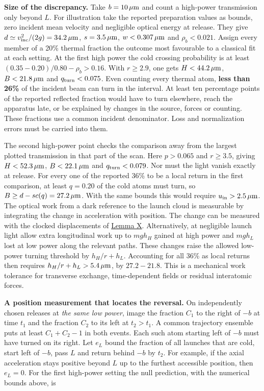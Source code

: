 \documentclass[11pt,a4paper]{article}
\begin{document}
\textbf{Size of the discrepancy.} Take \(b=10\,\mu{\rm m}\) and count a
high-power transmission only beyond \(L\). For illustration take the
reported preparation values as bounds, zero incident mean velocity and
negligible optical energy at release. They give
\(d\simeq v_{\rm inc}^2/(2g)=34.2\,\mu{\rm m}\), \(s=3.5\,\mu{\rm m}\),
\(w<0.307\,\mu{\rm m}\) and \(\rho_b<0.021\). Assign every member of a
20\% thermal fraction the outcome most favourable to a classical fit at
each setting. At the first high power the cold crossing probability is
at least \((0.35-0.20)/0.80-\rho_b>0.16\). With \(r\ge2.9\), one gets
\(H<44.2\,\mu{\rm m}\), \(B<21.8\,\mu{\rm m}\) and
\(q_{\rm turn}<0.075\). Even counting every thermal atom, \textbf{less
than 26\%} of the incident beam can turn in the interval. At least ten
percentage points of the reported reflected fraction would have to turn
elsewhere, reach the apparatus late, or be explained by changes in the
source, forces or counting. These fractions use a common incident
denominator. Loss and normalization errors must be carried into them.

The second high-power point checks the comparison away from the largest
plotted transmission in that part of the scan. Here \(p>0.065\) and
\(r\ge3.5\), giving \(H<52.3\,\mu{\rm m}\), \(B<22.1\,\mu{\rm m}\) and
\(q_{\rm turn}<0.079\). Nor must the light vanish exactly at release.
For every one of the reported 36\% to be a local return in the first
comparison, at least \(q=0.20\) of the cold atoms must turn, so
\(B\ge d-s c(q)=27.2\,\mu{\rm m}\). With the same bounds this would
require \(u_{\rm in}>2.5\,\mu{\rm m}\). The optical work from a dark
reference to the launch cloud is measurable by integrating the change in
acceleration with position. The change can be measured with the clocked
displacements of
\href{newton-insertion-action.md\#lemma-x-and-the-measurement-of-initial-force}{Lemma
X}. Alternatively, at negligible launch light allow extra longitudinal
work up to \(mg h_H\) gained at high power and \(mg h_L\) lost at low
power along the relevant paths. These changes raise the allowed
low-power turning threshold by \(h_H/r+h_L\). Accounting for all 36\% as
local returns then requires \(h_H/r+h_L>5.4\,\mu{\rm m}\), by
\(27.2-21.8\). This is a mechanical work tolerance for transverse
exchange, time-dependent fields or residual interatomic forces.

\textbf{A position measurement that locates the reversal.} On
independently chosen releases at \emph{the same low power}, image the
fraction \(C_1\) to the right of \(-b\) at time \(t_1\) and the fraction
\(C_2\) to its left at \(t_2>t_1\). A common trajectory ensemble puts at
least \(C_1+C_2-1\) in both events. Each such atom starting left of
\(-b\) must have turned on its right. Let \(e_L\) bound the fraction of
all launches that are cold, start left of \(-b\), pass \(L\) and return
behind \(-b\) by \(t_2\). For example, if the axial acceleration stays
positive beyond \(L\) up to the furthest accessible position, then
\(e_L=0\). For the first high-power setting the null prediction, with
the numerical bounds above, is
\end{document}
